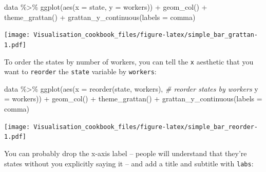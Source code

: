 \documentclass[
]{book}
\newenvironment{Shaded}{\begin{snugshade}}{\end{snugshade}}
\newcommand{\AttributeTok}[1]{\textcolor[rgb]{0.77,0.63,0.00}{#1}}
\newcommand{\CommentTok}[1]{\textcolor[rgb]{0.56,0.35,0.01}{\textit{#1}}}
\newcommand{\FunctionTok}[1]{\textcolor[rgb]{0.00,0.00,0.00}{#1}}
\newcommand{\NormalTok}[1]{#1}
\newcommand{\SpecialCharTok}[1]{\textcolor[rgb]{0.00,0.00,0.00}{#1}}
\begin{document}
\begin{Shaded}
\begin{Highlighting}[]
\NormalTok{data }\SpecialCharTok{\%\textgreater{}\%} 
  \FunctionTok{ggplot}\NormalTok{(}\FunctionTok{aes}\NormalTok{(}\AttributeTok{x =}\NormalTok{ state,}
             \AttributeTok{y =}\NormalTok{ workers)) }\SpecialCharTok{+} 
  \FunctionTok{geom\_col}\NormalTok{() }\SpecialCharTok{+} 
  \FunctionTok{theme\_grattan}\NormalTok{() }\SpecialCharTok{+} 
  \FunctionTok{grattan\_y\_continuous}\NormalTok{(}\AttributeTok{labels =}\NormalTok{ comma)}
\end{Highlighting}
\end{Shaded}

\texttt{[image: Visualisation\_cookbook\_files/figure-latex/simple\_bar\_grattan-1.pdf]}

To order the states by number of workers, you can tell the \texttt{x} aesthetic that you want to \texttt{reorder} the \texttt{state} variable by \texttt{workers}:

\begin{Shaded}
\begin{Highlighting}[]
\NormalTok{data }\SpecialCharTok{\%\textgreater{}\%} 
  \FunctionTok{ggplot}\NormalTok{(}\FunctionTok{aes}\NormalTok{(}\AttributeTok{x =} \FunctionTok{reorder}\NormalTok{(state, workers), }\CommentTok{\# reorder states by workers}
             \AttributeTok{y =}\NormalTok{ workers)) }\SpecialCharTok{+} 
  \FunctionTok{geom\_col}\NormalTok{() }\SpecialCharTok{+} 
  \FunctionTok{theme\_grattan}\NormalTok{() }\SpecialCharTok{+} 
  \FunctionTok{grattan\_y\_continuous}\NormalTok{(}\AttributeTok{labels =}\NormalTok{ comma)}
\end{Highlighting}
\end{Shaded}

\texttt{[image: Visualisation\_cookbook\_files/figure-latex/simple\_bar\_reorder-1.pdf]}

You can probably drop the x-axis label -- people will understand that they're states without you explicitly saying it -- and add a title and subtitle with \texttt{labs}:
\end{document}
